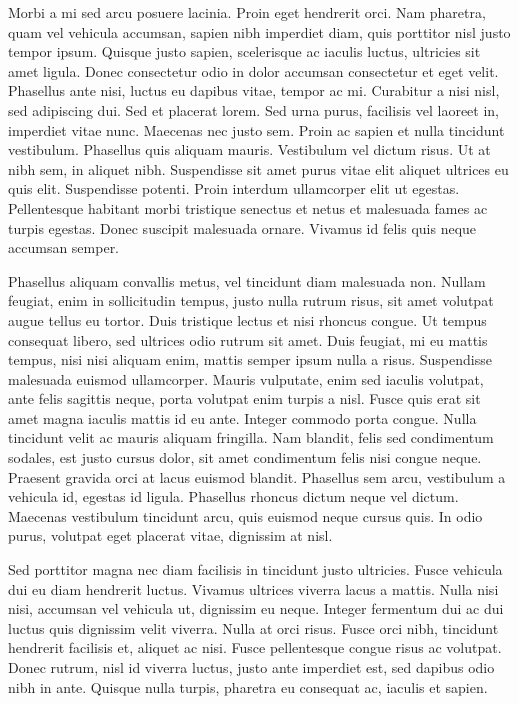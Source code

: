 Morbi a mi sed arcu posuere lacinia.
Proin eget hendrerit orci.
Nam pharetra, quam vel vehicula accumsan, sapien nibh imperdiet diam, quis porttitor nisl justo tempor ipsum.
Quisque justo sapien, scelerisque ac iaculis luctus, ultricies sit amet ligula.
Donec consectetur odio in dolor accumsan consectetur et eget velit.
Phasellus ante nisi, luctus eu dapibus vitae, tempor ac mi.
Curabitur a nisi nisl, sed adipiscing dui.
Sed et placerat lorem.
Sed urna purus, facilisis vel laoreet in, imperdiet vitae nunc.
Maecenas nec justo sem.
Proin ac sapien et nulla tincidunt vestibulum.
Phasellus quis aliquam mauris.
Vestibulum vel dictum risus.
Ut at nibh sem, in aliquet nibh.
Suspendisse sit amet purus vitae elit aliquet ultrices eu quis elit.
Suspendisse potenti.
Proin interdum ullamcorper elit ut egestas.
Pellentesque habitant morbi tristique senectus et netus et malesuada fames ac turpis egestas.
Donec suscipit malesuada ornare.
Vivamus id felis quis neque accumsan semper.

Phasellus aliquam convallis metus, vel tincidunt diam malesuada non.
Nullam feugiat, enim in sollicitudin tempus, justo nulla rutrum risus, sit amet volutpat augue tellus eu tortor.
Duis tristique lectus et nisi rhoncus congue.
Ut tempus consequat libero, sed ultrices odio rutrum sit amet.
Duis feugiat, mi eu mattis tempus, nisi nisi aliquam enim, mattis semper ipsum nulla a risus.
Suspendisse malesuada euismod ullamcorper.
Mauris vulputate, enim sed iaculis volutpat, ante felis sagittis neque, porta volutpat enim turpis a nisl.
Fusce quis erat sit amet magna iaculis mattis id eu ante.
Integer commodo porta congue.
Nulla tincidunt velit ac mauris aliquam fringilla.
Nam blandit, felis sed condimentum sodales, est justo cursus dolor, sit amet condimentum felis nisi congue neque.
Praesent gravida orci at lacus euismod blandit.
Phasellus sem arcu, vestibulum a vehicula id, egestas id ligula.
Phasellus rhoncus dictum neque vel dictum.
Maecenas vestibulum tincidunt arcu, quis euismod neque cursus quis.
In odio purus, volutpat eget placerat vitae, dignissim at nisl.

Sed porttitor magna nec diam facilisis in tincidunt justo ultricies.
Fusce vehicula dui eu diam hendrerit luctus.
Vivamus ultrices viverra lacus a mattis.
Nulla nisi nisi, accumsan vel vehicula ut, dignissim eu neque.
Integer fermentum dui ac dui luctus quis dignissim velit viverra.
Nulla at orci risus.
Fusce orci nibh, tincidunt hendrerit facilisis et, aliquet ac nisi.
Fusce pellentesque congue risus ac volutpat.
Donec rutrum, nisl id viverra luctus, justo ante imperdiet est, sed dapibus odio nibh in ante.
Quisque nulla turpis, pharetra eu consequat ac, iaculis et sapien.


